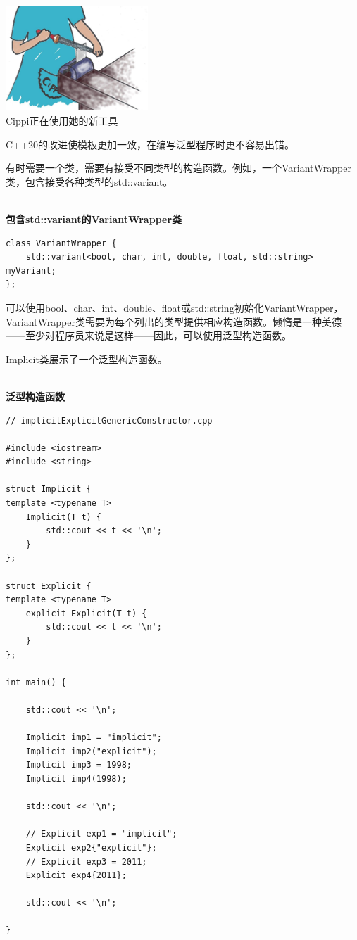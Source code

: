 \begin{center}
\includegraphics[width=0.4\textwidth]{content/3/chapter4/images/40.png}\\
Cippi正在使用她的新工具
\end{center}

C++20的改进使模板更加一致，在编写泛型程序时更不容易出错。


有时需要一个类，需要有接受不同类型的构造函数。例如，一个VariantWrapper类，包含接受各种类型的std::variant。

\hspace*{\fill} \\ %
\noindent
\textbf{包含std::variant的VariantWrapper类}
\begin{lstlisting}[style=styleCXX]
class VariantWrapper {
	std::variant<bool, char, int, double, float, std::string> myVariant;
};
\end{lstlisting}

可以使用bool、char、int、double、float或std::string初始化VariantWrapper，VariantWrapper类需要为每个列出的类型提供相应构造函数。懒惰是一种美德——至少对程序员来说是这样——因此，可以使用泛型构造函数。

Implicit类展示了一个泛型构造函数。

\hspace*{\fill} \\ %
\noindent
\textbf{泛型构造函数}
\begin{lstlisting}[style=styleCXX]
// implicitExplicitGenericConstructor.cpp

#include <iostream>
#include <string>

struct Implicit {
template <typename T>
	Implicit(T t) {
		std::cout << t << '\n';
	}
};

struct Explicit {
template <typename T>
	explicit Explicit(T t) {
		std::cout << t << '\n';
	}
};

int main() {
	
	std::cout << '\n';
	
	Implicit imp1 = "implicit";
	Implicit imp2("explicit");
	Implicit imp3 = 1998;
	Implicit imp4(1998);
	
	std::cout << '\n';
	
	// Explicit exp1 = "implicit";
	Explicit exp2{"explicit"};
	// Explicit exp3 = 2011;
	Explicit exp4{2011};
	
	std::cout << '\n';

}
\end{lstlisting}

